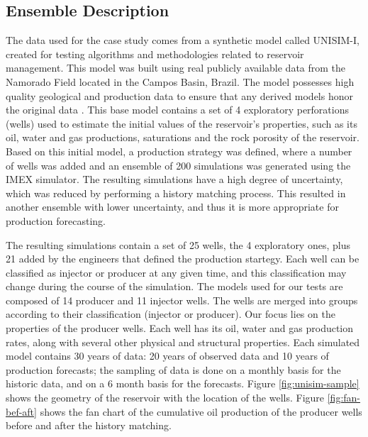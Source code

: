 \documentclass[final,5p,times,twocolumn]{elsarticle}
\begin{document}
\subsection{Ensemble Description}
\label{sec:data}
The data used for the case study comes from a synthetic model called UNISIM-I, created for testing algorithms and methodologies related to reservoir management. This model was built using real publicly available data from the Namorado Field located in the Campos Basin, Brazil. The model possesses high quality geological and production data to ensure that any derived models honor the original data \cite{unisim-avansi:2015}. This base model contains a set of 4 exploratory perforations (wells) used to estimate the initial values of the reservoir's properties, such as its oil, water and gas productions, saturations and the rock porosity of the reservoir. Based on this initial model, a production strategy was defined, where a number of wells was added and an ensemble of 200 simulations was generated using the IMEX simulator. The resulting simulations have a high degree of uncertainty, which was reduced by performing a history matching process. This resulted in another ensemble with lower uncertainty, and thus it is more appropriate for production forecasting.

The resulting simulations contain a set of 25 wells, the 4 exploratory ones, plus 21 added by the engineers that defined the production startegy. Each well can be classified as injector or producer at any given time, and this classification may change during the course of the simulation. The models used for our tests are composed of 14 producer and 11 injector wells. The wells are merged into groups according to their classification (injector or producer). Our focus lies on the properties of the producer wells. Each well has its oil, water and gas production rates, along with several other physical and structural properties. Each simulated model contains 30 years of data: 20 years of observed data and 10 years of production forecasts; the sampling of data is done on a monthly basis for the historic data, and on a 6 month basis for the forecasts. Figure \ref{fig:unisim-sample} shows the geometry of the reservoir with the location of the wells. Figure \ref{fig:fan-bef-aft} shows the fan chart of the cumulative oil production of the producer wells before and after the history matching.
\end{document}
